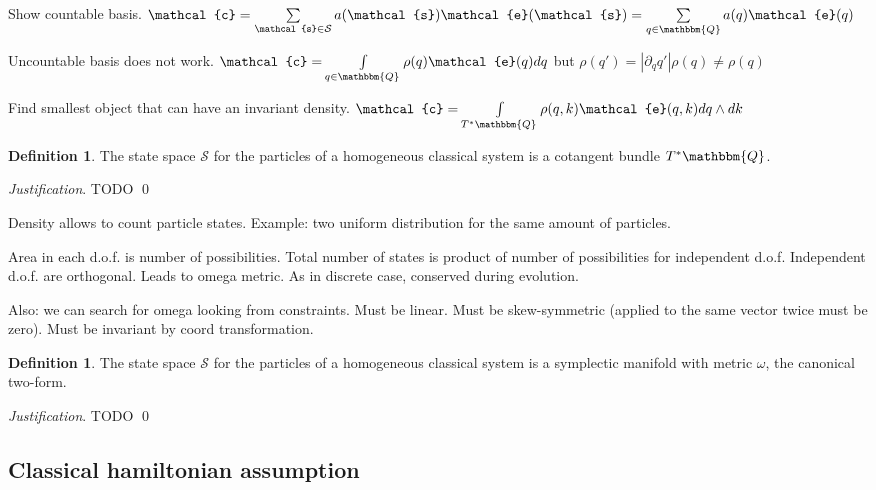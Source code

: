 \documentclass[aps,pra,10pt,twocolumn,floatfix,nofootinbib]{revtex4-1}
\theoremstyle{definition}
\newtheorem{defn}[prop]{Definition}
\newenvironment{justification}{\emph{Justification}.}{\qed}
\begin{document}
Show countable basis. $\mathcal{c}= \sum\limits_{\mathcal{s} \in \mathcal{S}} a(\mathcal{s}) \mathcal{e}(\mathcal{s})=\sum\limits_{q \in \mathbbm{Q}} a(q) \mathcal{e}(q)$


Uncountable basis does not work. $\mathcal{c}= \int\limits_{q \in \mathbbm{Q}} \rho(q) \mathcal{e}(q)dq$ but $\rho(q')=|\partial _{q}q'|\rho(q)\neq\rho(q)$


Find smallest object that can have an invariant density. $\mathcal{c}= \int\limits_{T^*\mathbbm{Q}} \rho(q,k) \mathcal{e}(q,k)dq\wedge dk$

\begin{defn}\label{classical_phase_space}
The state space $\mathcal{S}$ for the particles of a homogeneous classical  system is a cotangent bundle $T^*\mathbbm{Q}$.
\end{defn}

\begin{justification}
	TODO
\end{justification}

Density allows to count particle states. Example: two uniform distribution for the same amount of particles.

Area in each d.o.f. is number of possibilities. Total number of states is product of number of possibilities for independent d.o.f. Independent d.o.f. are orthogonal. Leads to omega metric. As in discrete case, conserved during evolution.

Also: we can search for omega looking from constraints. Must be linear. Must be skew-symmetric (applied to the same vector twice must be zero). Must be invariant by coord transformation. 

\begin{defn}\label{symplectic_manifold}
	The state space $\mathcal{S}$ for the particles of a homogeneous classical  system is a symplectic manifold with metric $\omega$, the canonical two-form.
\end{defn}

\begin{justification}
	TODO
\end{justification}

\subsection{Classical hamiltonian assumption}
\end{document}
